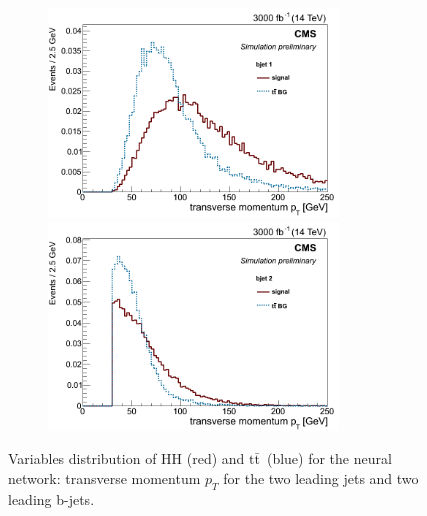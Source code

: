 \documentclass[10pt,a4paper]{article}
\newcommand{\ww}{7.7cm} %
\newcommand{\dd}{-2mm} %
\renewcommand{\tt}{$\text{t}\bar{\text{t}}$}
\begin{document}
\begin{figure}[h]
  \begin{subfigure}[b]{17cm}
    \begin{minipage}[h!]{\ww}
      \centering
      \includegraphics[width=\ww]{figs/bjet1Pt.png}
    \end{minipage}
    \begin{minipage}[h!]{\ww}
      \centering
      \includegraphics[width=\ww]{figs/bjet2Pt.png}
    \end{minipage}
    \hspace{9mm}
  \end{subfigure}	
  \vspace{\dd}
  \caption{Variables distribution of HH (red) and \tt\ (blue) for the neural network: transverse momentum $p_T$ for the two leading jets and two leading b-jets.} \label{vars2}

\end{figure}
\end{document}
